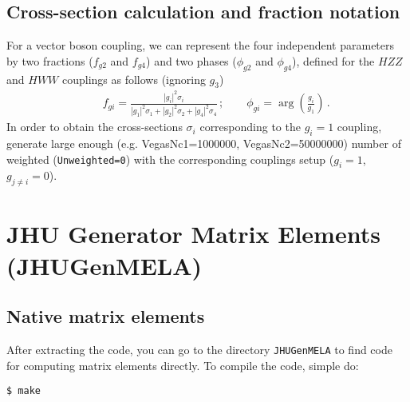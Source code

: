 \documentclass[aps,superscriptaddress,nofootinbib]{revtex4}
\begin{document}
\subsection{Cross-section calculation and fraction notation}

For a vector boson coupling, we can represent the four independent parameters by two  fractions 
($f_{g2}$ and $f_{g4}$) and two phases ($\phi_{g2}$ and $\phi_{g4}$), defined for the $HZZ$
and $HWW$ couplings as follows (ignoring $g_3$)
%
\begin{eqnarray}
&& f_{gi} =  \frac{|g^{}_{i}|^2\sigma_i}{|g^{}_{1}|^2\sigma_1+|g^{}_{2}|^2\sigma_2+|g^{}_{4}|^2\sigma_4}\,;
~~~~~~~~~
 \phi_{gi} = \arg\left(\frac{g_i}{g_1}\right)\,.
\nonumber
\label{eq:fractions}
\end{eqnarray}
%
In order to obtain the cross-sections $\sigma_i$ corresponding to the $g^{}_{i}=1$ coupling, 
generate large enough (e.g. VegasNc1=1000000, VegasNc2=50000000) number of weighted
({\tt Unweighted=0}) with the corresponding couplings setup ($g^{}_{i}=1$, $g^{}_{j\ne i}=0$).

\section{ JHU Generator Matrix Elements (JHUGenMELA)}

\subsection{Native matrix elements}

After extracting the code, you can go to the directory \verb|JHUGenMELA| to find code for computing matrix elements directly.  
To compile the code, simple do:
\begin{verbatim}
$ make
\end{verbatim}
\end{document}
